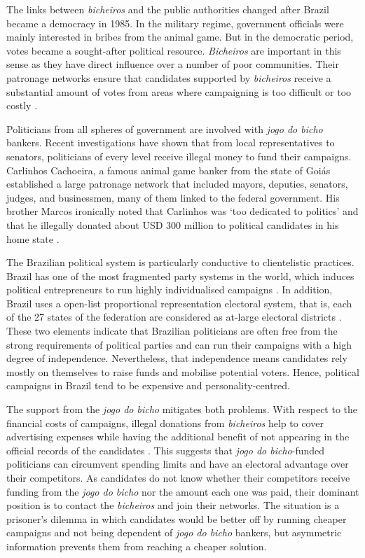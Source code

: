 \documentclass[a4paper,12pt]{article}
\begin{document}
The links between \emph{bicheiros} and the public authorities changed after Brazil became a democracy in 1985. In the military regime, government officials were mainly interested in bribes from the animal game. But in the democratic period, votes became a sought-after political resource. \emph{Bicheiros} are important in this sense as they have direct influence over a number of poor communities. Their patronage networks ensure that candidates supported by \emph{bicheiros} receive a substantial amount of votes from areas where campaigning is too difficult or too costly \citep[17]{misse2011crime}.

Politicians from all spheres of government are involved with \textit{jogo do bicho} bankers. Recent investigations have shown that from local representatives to senators, politicians of every level receive illegal money to fund their campaigns. Carlinhos Cachoeira, a famous animal game banker from the state of Goiás established a large patronage network that included mayors, deputies, senators, judges, and businessmen, many of them linked to the federal government. His brother Marcos ironically noted that Carlinhos was `too dedicated to politics' and that he illegally donated about USD 300 million to political candidates in his home state \citep{estadao2012gene}. 

The Brazilian political system is particularly conductive to clientelistic practices. Brazil has one of the most fragmented party systems in the world, which induces political entrepreneurs to run highly individualised campaigns \citep{figueiredo2000presidential,geddes1992institutional}. In addition, Brazil uses a open-list proportional representation electoral system, that is, each of the 27 states of the federation are considered as at-large electoral districts \citetext{\citealp{ames1995electoral}; \citealp[483]{samuels2000ambition}}. These two elements indicate that Brazilian politicians are often free from the strong requirements of political parties and can run their campaigns with a high degree of independence. Nevertheless, that independence means candidates rely mostly on themselves to raise funds and mobilise potential voters. Hence, political campaigns in Brazil tend to be expensive and personality-centred.

The support from the \emph{jogo do bicho} mitigates both problems. With respect to the financial costs of campaigns, illegal donations from \emph{bicheiros} help to cover advertising expenses while having the additional benefit of not appearing in the official records of the candidates \citep{congressoemfoco2007bicho,globo2012bicheiro}. This suggests that \emph{jogo do bicho}-funded politicians can circumvent spending limits and have an electoral advantage over their competitors. As candidates do not know whether their competitors receive funding from the \emph{jogo do bicho} nor the amount each one was paid, their dominant position is to contact the \emph{bicheiros} and join their networks. The situation is a prisoner's dilemma in which candidates would be better off by running cheaper campaigns and not being dependent of \emph{jogo do bicho} bankers, but asymmetric information prevents them from reaching a cheaper solution.
\end{document}
